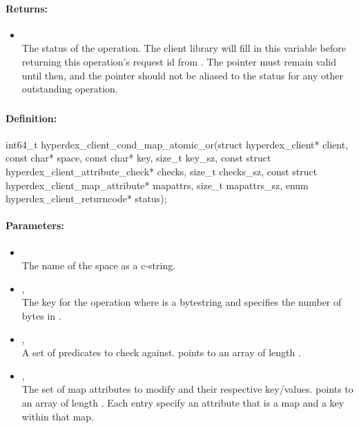 \paragraph{Returns:}
\begin{itemize}[noitemsep]
\item {}\\
The status of the operation.  The client library will fill in this variable before returning this operation's request id from .  The pointer must remain valid until then, and the pointer should not be aliased to the status for any other outstanding operation.
\end{itemize}

\pagebreak
\subsubsection{}
\label{api:c:cond_map_atomic_or}


\paragraph{Definition:}
\begin{ccode}
int64_t hyperdex_client_cond_map_atomic_or(struct hyperdex_client* client,
        const char* space,
        const char* key, size_t key_sz,
        const struct hyperdex_client_attribute_check* checks, size_t checks_sz,
        const struct hyperdex_client_map_attribute* mapattrs, size_t mapattrs_sz,
        enum hyperdex_client_returncode* status);
\end{ccode}

\paragraph{Parameters:}
\begin{itemize}[noitemsep]
\item {}\\
The name of the space as a c-string.
\item {}, \\
The key for the operation where  is a bytestring and  specifies the number of bytes in .
\item {}, \\
A set of predicates to check against.   points to an array of length .
\item {}, \\
The set of map attributes to modify and their respective key/values.   points to an array of length .  Each entry specify an attribute that is a map and a key within that map.
\end{itemize}

